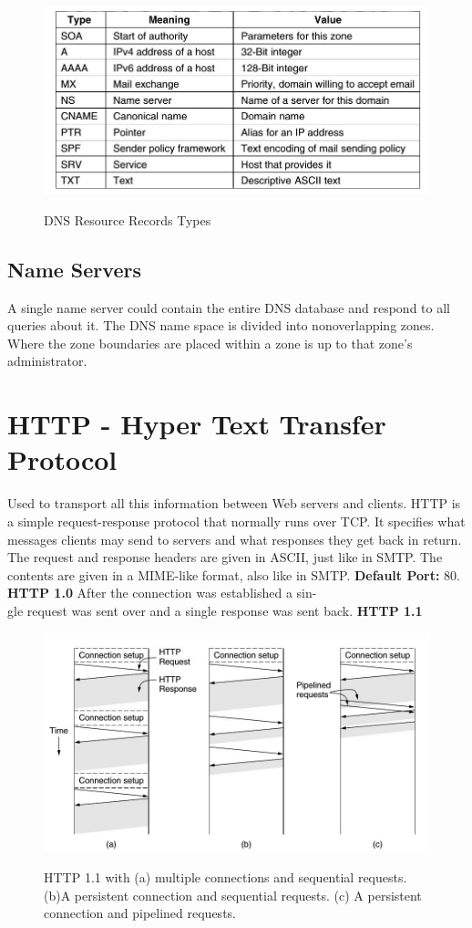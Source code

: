 \documentclass[a4paper,oneside]{book}
\begin{document}
\begin{figure}[H]
\caption{DNS Resource Records Types}
\includegraphics[scale=0.7]{Images/dnsresrec}
\label{fig:dns_res_rec}
\end{figure}
\subsection{Name Servers}
A single name server could contain the entire DNS database
and respond to all queries about it.  The DNS name space is divided into nonoverlapping zones. Where the zone boundaries are placed within a zone is up to that zone's administrator. 
\section{HTTP - Hyper Text Transfer Protocol}
 Used to transport all this information between Web servers and clients. HTTP is a simple request-response protocol that normally runs over TCP. It  specifies what messages clients may send to servers and what responses they get  back in return.\\
 The request and response headers are given in ASCII, just like in
SMTP. The contents are given in a MIME-like format, also like in SMTP. 
\textbf{Default Port:} 80.\\
\textbf{HTTP 1.0} After the connection was established a sin-\\
gle request was sent over and a single response was sent back.
\textbf{HTTP 1.1}
\begin{figure}[H]
\caption{HTTP 1.1 with (a) multiple connections and sequential requests. (b)A persistent connection and sequential requests. (c) A persistent connection and pipelined requests. }
\includegraphics[scale=0.5]{Images/httpreq}
\label{fig:http_req}
\end{figure}
\end{document}
